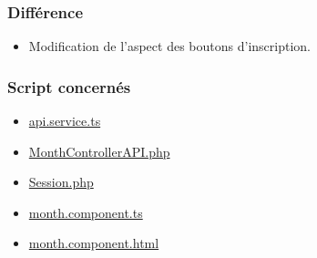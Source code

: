 \subsubsection{Différence}
	\begin{itemize}
		\item Modification de l'aspect des boutons d'inscription. 
	\end{itemize}
	
\vspace{\baselineskip}
\subsubsection{Script concernés}
	\begin{itemize}
		\item \href{https://github.com/victorsmits/Aquabike/blob/master/frontend/src/app/service/api.service.ts}{api.service.ts}
		\item \href{https://github.com/victorsmits/Aquabike/blob/master/backend/src/Controller/API/MonthControllerAPI.php}{MonthControllerAPI.php}
		\item \href{https://github.com/victorsmits/Aquabike/blob/master/backend/src/Entity/Session.php}{Session.php}
		\item \href{https://github.com/victorsmits/Aquabike/blob/master/frontend/src/app/month/month.component.ts}{month.component.ts}
		\item \href{https://github.com/victorsmits/Aquabike/blob/master/frontend/src/app/month/month.component.html}{month.component.html}
	\end{itemize}